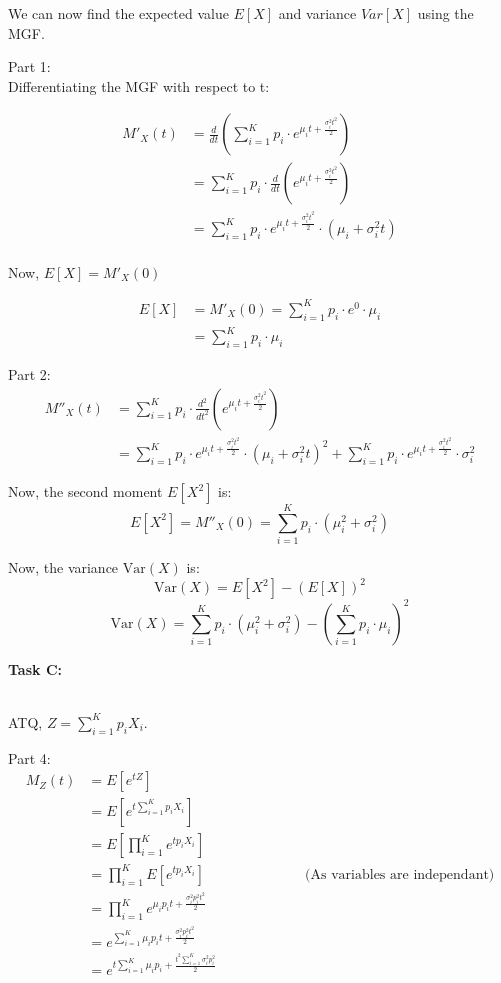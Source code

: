 \documentclass[a4paper,12pt,answers]{exam}
\begin{document}
\begin{questions}
\begin{solution}
We can now find the expected value $E[X]$ and variance $Var[X]$ using the MGF.

Part 1:\\
Differentiating the MGF with respect to t:

\begin{align*}
M'_X(t) &= \frac{d}{dt} \left( \sum_{i=1}^{K} p_i \cdot e^{\mu_i t + \frac{\sigma_i^2 t^2}{2}} \right)  \\
&= \sum_{i=1}^{K} p_i \cdot \frac{d}{dt} \left( e^{\mu_i t + \frac{\sigma_i^2 t^2}{2}} \right)\\
&=\sum_{i=1}^{K} p_i \cdot e^{\mu_i t + \frac{\sigma_i^2 t^2}{2}} \cdot \left( \mu_i + \sigma_i^2 t \right)\\
\end{align*}


Now, $E[X]=M'_X(0)$

\begin{align*}
E[X] &= M'_X(0) = \sum_{i=1}^{K} p_i \cdot e^{0} \cdot \mu_i \\
&= \sum_{i=1}^{K} p_i \cdot \mu_i
\end{align*}

Part 2:
\begin{align*}
M''_X(t) &= \sum_{i=1}^{K} p_i \cdot \frac{d^2}{dt^2} \left( e^{\mu_i t + \frac{\sigma_i^2 t^2}{2}} \right)\\
&= \sum_{i=1}^{K} p_i \cdot e^{\mu_i t + \frac{\sigma_i^2 t^2}{2}} \cdot \left( \mu_i + \sigma_i^2 t \right)^2 + \sum_{i=1}^{K} p_i \cdot e^{\mu_i t + \frac{\sigma_i^2 t^2}{2}} \cdot \sigma_i^2
\end{align*}

Now, the second moment $E[X^2]$ is:
\[
E[X^2] = M''_X(0) = \sum_{i=1}^{K} p_i \cdot \left( \mu_i^2 + \sigma_i^2 \right)
\]

Now, the variance $\text{Var}(X)$ is:
\[
\text{Var}(X) = E[X^2] - (E[X])^2
\]
\[
\text{Var}(X) = \sum_{i=1}^{K} p_i \cdot \left( \mu_i^2 + \sigma_i^2 \right) - \left( \sum_{i=1}^{K} p_i \cdot \mu_i \right)^2
\]
\end{solution}

\textbf{Task C:}
\begin{solution}\\
ATQ, $Z=\sum_{i=1}^K p_i X_i$.

Part 4:
\begin{align*}
M_Z(t)&=E[e^{tZ}]\\
&=E[e^{t\sum_{i=1}^K p_i X_i}]\\
&=E[\prod_{i=1}^K e^{t p_i X_i}]\\
&=\prod_{i=1}^K E[e^{t p_i X_i}] \hspace{3cm} \text{(As variables are independant)}\\
&=\prod_{i=1}^K e^{\mu_i p_i t + \frac{\sigma_i^2 p_i^2 t^2}{2}}\\
&=e^{\sum_{i=1}^K \mu_i p_i t + \frac{\sigma_i^2 p_i^2 t^2}{2}}\\
&=e^{ t \sum_{i=1}^K \mu_i p_i + \frac{t^2 \sum_{i=1}^K \sigma_i^2 p_i^2}{2}}\\
\end{align*}



\end{solution}
\end{questions}
\end{document}
